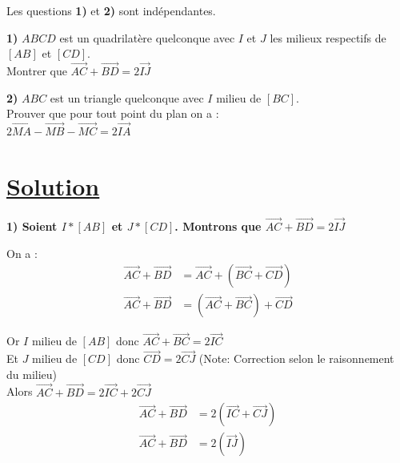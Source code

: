 \documentclass{article}
\begin{document}
\noindent Les questions \textbf{1)} et \textbf{2)} sont indépendantes.

\vspace{1em}

\noindent \textbf{1)} $ABCD$ est un quadrilatère quelconque avec $I$ et $J$ les milieux respectifs de $[AB]$ et $[CD]$. \\
Montrer que $\overrightarrow{AC} + \overrightarrow{BD} = 2\overrightarrow{IJ}$

\vspace{2em}

\noindent \textbf{2)} $ABC$ est un triangle quelconque avec $I$ milieu de $[BC]$. \\
Prouver que pour tout point du plan on a : \\
$2\overrightarrow{MA} - \overrightarrow{MB} - \overrightarrow{MC} = 2\overrightarrow{IA}$

\section*{\underline{\color{red}Solution}}

\noindent \textbf{1) Soient $I * [AB]$ et $J * [CD]$. Montrons que $\overrightarrow{AC} + \overrightarrow{BD} = 2\overrightarrow{IJ}$}

\vspace{1em}

\noindent On a :
\begin{align*}
\overrightarrow{AC} + \overrightarrow{BD} &= \overrightarrow{AC} + (\overrightarrow{BC} + \overrightarrow{CD}) \\
\overrightarrow{AC} + \overrightarrow{BD} &= (\overrightarrow{AC} + \overrightarrow{BC}) + \overrightarrow{CD}
\end{align*}

\noindent Or $I$ milieu de $[AB]$ donc $\overrightarrow{AC} + \overrightarrow{BC} = 2\overrightarrow{IC}$ \\
Et $J$ milieu de $[CD]$ donc $\overrightarrow{CD} = 2\overrightarrow{CJ}$ (Note: Correction selon le raisonnement du milieu) \\
\noindent Alors $\overrightarrow{AC} + \overrightarrow{BD} = 2\overrightarrow{IC} + 2\overrightarrow{CJ}$
\begin{align*}
\overrightarrow{AC} + \overrightarrow{BD} &= 2(\overrightarrow{IC} + \overrightarrow{CJ}) \\
\overrightarrow{AC} + \overrightarrow{BD} &= 2(\overrightarrow{IJ})
\end{align*}
\end{document}

